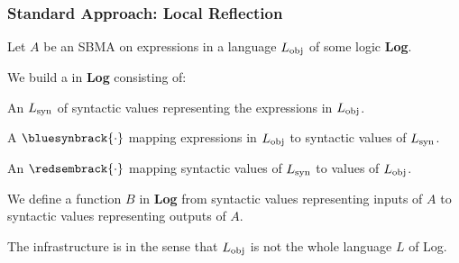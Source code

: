 \documentclass[t,12pt,numbers,fleqn]{beamer}
\begin{document}

\begin{frame}
\frametitle{Standard Approach: Local Reflection}
\bi

  \item Let $A$ be an SBMA on expressions in a language $L_{\rm obj}$
    of some logic \textbf{Log}.

  \item We build a  in
    \textbf{Log} consisting of:

  \be

    \item An  $L_{\rm syn}$ of syntactic values
      representing the expressions in $L_{\rm obj}$.

    \item A  $\bluesynbrack{\cdot}$ mapping
      expressions in $L_{\rm obj}$ to syntactic values of $L_{\rm
        syn}$.

    \item An  $\redsembrack{\cdot}$
      mapping syntactic values of $L_{\rm syn}$ to values of $L_{\rm
        obj}$.

  \ee

  \item We define a function $B$ in \textbf{Log} from syntactic values
    representing inputs of $A$ to syntactic values representing
    outputs of $A$.

  \item The infrastructure is  in the sense that $L_{\rm
    obj}$ is not the whole language $L$ of Log.

\ei
\end{frame}

\end{document}
